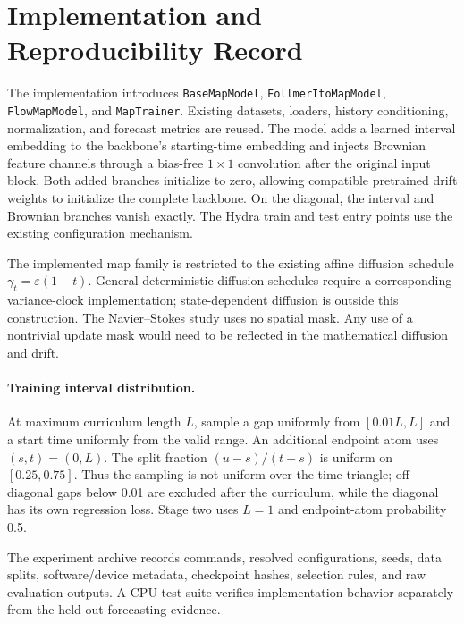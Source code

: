 \section{Implementation and Reproducibility Record}
The implementation introduces \texttt{BaseMapModel}, \texttt{FollmerItoMapModel}, \texttt{FlowMapModel}, and \texttt{MapTrainer}. Existing datasets, loaders, history conditioning, normalization, and forecast metrics are reused. The model adds a learned interval embedding to the backbone's starting-time embedding and injects Brownian feature channels through a bias-free $1\times1$ convolution after the original input block. Both added branches initialize to zero, allowing compatible pretrained drift weights to initialize the complete backbone. On the diagonal, the interval and Brownian branches vanish exactly. The Hydra train and test entry points use the existing configuration mechanism.

The implemented map family is restricted to the existing affine diffusion schedule $\gamma_t=\varepsilon(1-t)$. General deterministic diffusion schedules require a corresponding variance-clock implementation; state-dependent diffusion is outside this construction. The Navier--Stokes study uses no spatial mask. Any use of a nontrivial update mask would need to be reflected in the mathematical diffusion and drift.

\paragraph{Training interval distribution.} At maximum curriculum length $L$, sample a gap uniformly from $[0.01L,L]$ and a start time uniformly from the valid range. An additional endpoint atom uses $(s,t)=(0,L)$. The split fraction $(u-s)/(t-s)$ is uniform on $[0.25,0.75]$. Thus the sampling is not uniform over the time triangle; off-diagonal gaps below 0.01 are excluded after the curriculum, while the diagonal has its own regression loss. Stage two uses $L=1$ and endpoint-atom probability 0.5.

The experiment archive records commands, resolved configurations, seeds, data splits, software/device metadata, checkpoint hashes, selection rules, and raw evaluation outputs. A CPU test suite verifies implementation behavior separately from the held-out forecasting evidence. 

